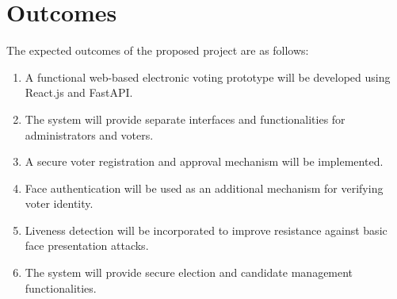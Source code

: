 \documentclass[12pt,a4paper]{report}
\begin{document}

\chapter{Outcomes}

The expected outcomes of the proposed project are as follows:

\begin{enumerate}[leftmargin=*, itemsep=5pt]
	
	\item A functional web-based electronic voting prototype will be developed using React.js and FastAPI.
	
	\item The system will provide separate interfaces and functionalities for administrators and voters.
	
	\item A secure voter registration and approval mechanism will be implemented.
	
	\item Face authentication will be used as an additional mechanism for verifying voter identity.
	
	\item Liveness detection will be incorporated to improve resistance against basic face presentation attacks.
	
	\item The system will provide secure election and candidate management functionalities.
	
\end{enumerate}
\end{document}
